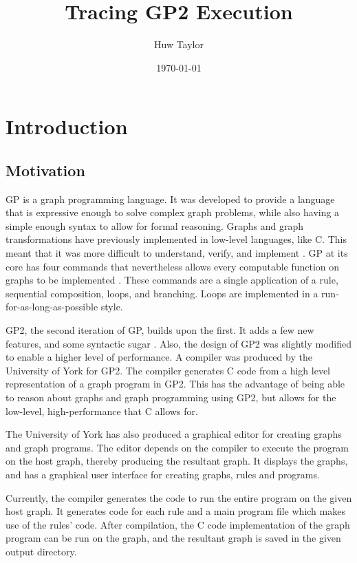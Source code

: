 \documentclass{UoYCSproject}
\author{Huw Taylor}
\title{Tracing GP2 Execution} %
\date{\today}
\begin{document}
\maketitle
\tableofcontents


\chapter{Introduction}
\section{Motivation}
GP is a graph programming language. It was developed to provide a language that is expressive enough to solve complex graph problems, while also having a simple enough syntax to allow for formal reasoning. Graphs and graph transformations have previously implemented in low-level languages, like C. This meant that it was more difficult to understand, verify, and implement \cite{gp_lang}. GP at its core has four commands that nevertheless allows every computable function on graphs to be implemented \cite{gp1}. These commands are a single application of a rule, sequential composition, loops, and branching. Loops are implemented in a run-for-as-long-as-possible style.

GP2, the second iteration of GP, builds upon the first. It adds a few new features, and some syntactic sugar \cite{gp2_design}. Also, the design of GP2 was slightly modified to enable a higher level of performance. A compiler was produced by the University of York for GP2. The compiler generates C code from a high level representation of a graph program in GP2. This has the advantage of being able to reason about graphs and graph programming using GP2, but allows for the low-level, high-performance that C allows for.

The University of York has also produced a graphical editor for creating graphs and graph programs. The editor depends on the compiler to execute the program on the host graph, thereby producing the resultant graph. It displays the graphs, and has a graphical user interface for creating graphs, rules and programs.

Currently, the compiler generates the code to run the entire program on the given host graph. It generates code for each rule and a main program file which makes use of the rules' code. After compilation, the C code implementation of the graph program can be run on the graph, and the resultant graph is saved in the given output directory.
\end{document}
